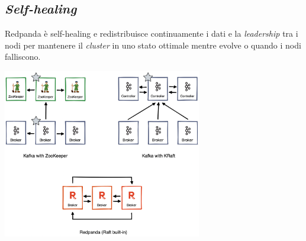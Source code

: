 \subsection{\textit{Self-healing}}
Redpanda è self-healing e redistribuisce continuamente i dati e la \textit{leadership} tra i nodi per mantenere il \textit{cluster} in uno stato ottimale mentre evolve o quando i nodi falliscono.


\begin{center}
	\includegraphics[width=0.65\textwidth]{imgs/kafka_zookeeper.png}
\end{center}












